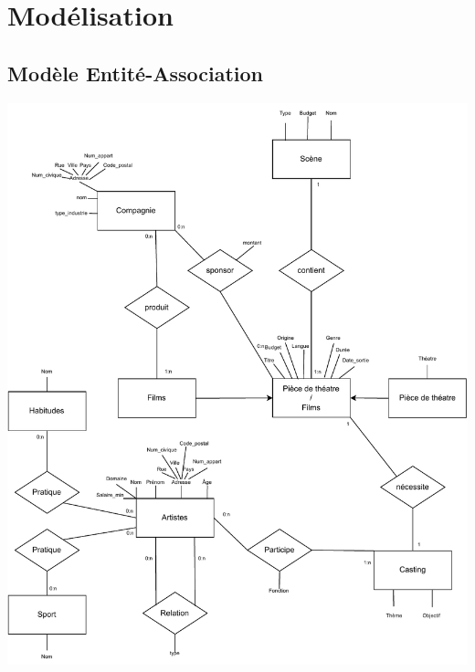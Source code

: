 \documentclass{article}
\begin{document}
\section{Modélisation}

\subsection{Modèle Entité-Association}
\begin{center}
  \includegraphics[scale=0.85]{../modeleEA.pdf}
\end{center}
\newpage
\end{document}
